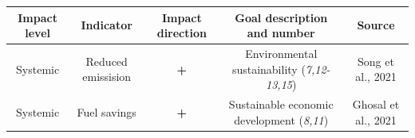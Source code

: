 \documentclass[
]{book}
\begin{document}
\begin{longtable}[]{@{}ccccc@{}}
\toprule
\begin{minipage}[b]{0.17\columnwidth}\centering
Impact level\strut
\end{minipage} & \begin{minipage}[b]{0.16\columnwidth}\centering
Indicator\strut
\end{minipage} & \begin{minipage}[b]{0.17\columnwidth}\centering
Impact direction\strut
\end{minipage} & \begin{minipage}[b]{0.17\columnwidth}\centering
Goal description and number\strut
\end{minipage} & \begin{minipage}[b]{0.17\columnwidth}\centering
Source\strut
\end{minipage}\tabularnewline
\midrule
\endhead
\begin{minipage}[t]{0.17\columnwidth}\centering
Systemic\strut
\end{minipage} & \begin{minipage}[t]{0.16\columnwidth}\centering
Reduced emissision\strut
\end{minipage} & \begin{minipage}[t]{0.17\columnwidth}\centering
\textbf{+}\strut
\end{minipage} & \begin{minipage}[t]{0.17\columnwidth}\centering
Environmental sustainability (\emph{7,12-13,15})\strut
\end{minipage} & \begin{minipage}[t]{0.17\columnwidth}\centering
Song et al., 2021\strut
\end{minipage}\tabularnewline
\begin{minipage}[t]{0.17\columnwidth}\centering
Systemic\strut
\end{minipage} & \begin{minipage}[t]{0.16\columnwidth}\centering
Fuel savings\strut
\end{minipage} & \begin{minipage}[t]{0.17\columnwidth}\centering
\textbf{+}\strut
\end{minipage} & \begin{minipage}[t]{0.17\columnwidth}\centering
Sustainable economic development (\emph{8,11})\strut
\end{minipage} & \begin{minipage}[t]{0.17\columnwidth}\centering
Ghosal et al., 2021\strut

\end{minipage}
\end{longtable}
\end{document}

